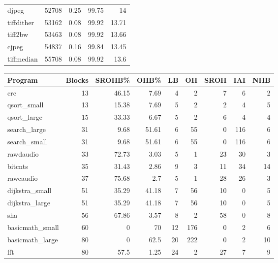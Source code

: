 \begin{tabular}{lrrrr}
 djpeg           &   52708 &   0.25 &        99.75 &   14    \\
 tiffdither      &   53162 &   0.08 &        99.92 &   13.71 \\
 tiff2bw         &   53463 &   0.08 &        99.92 &   13.66 \\
 cjpeg           &   54837 &   0.16 &        99.84 &   13.45 \\
 tiffmedian      &   55708 &   0.08 &        99.92 &   13.6  \\
\hline
\end{tabular}\begin{tabular}{lrrrrrrrr}
\hline
 Program         &   Blocks &   SROHB\% &   OHB\% &   LB &   OH &   SROH &   IAI &   NHB \\
\hline
 crc             &       13 &    46.15 &   7.69 &    4 &    2 &      7 &     6 &     2 \\
 qsort\_small     &       13 &    15.38 &   7.69 &    5 &    2 &      2 &     4 &     5 \\
 qsort\_large     &       15 &    33.33 &   6.67 &    5 &    2 &      6 &     4 &     4 \\
 search\_large    &       31 &     9.68 &  51.61 &    6 &   55 &      0 &   116 &     6 \\
 search\_small    &       31 &     9.68 &  51.61 &    6 &   55 &      0 &   116 &     6 \\
 rawdaudio       &       33 &    72.73 &   3.03 &    5 &    1 &     23 &    30 &     3 \\
 bitcnts         &       35 &    31.43 &   2.86 &    9 &    3 &     11 &    34 &    14 \\
 rawcaudio       &       37 &    75.68 &   2.7  &    5 &    1 &     28 &    26 &     3 \\
 dijkstra\_small  &       51 &    35.29 &  41.18 &    7 &   56 &     10 &     0 &     5 \\
 dijkstra\_large  &       51 &    35.29 &  41.18 &    7 &   56 &     10 &     0 &     5 \\
 sha             &       56 &    67.86 &   3.57 &    8 &    2 &     58 &     0 &     8 \\
 basicmath\_small &       60 &     0    &  70    &   12 &  176 &      0 &     2 &     6 \\
 basicmath\_large &       80 &     0    &  62.5  &   20 &  222 &      0 &     2 &    10 \\
 fft             &       80 &    57.5  &   1.25 &   24 &    2 &     27 &     7 &     9 \\

\end{tabular}
